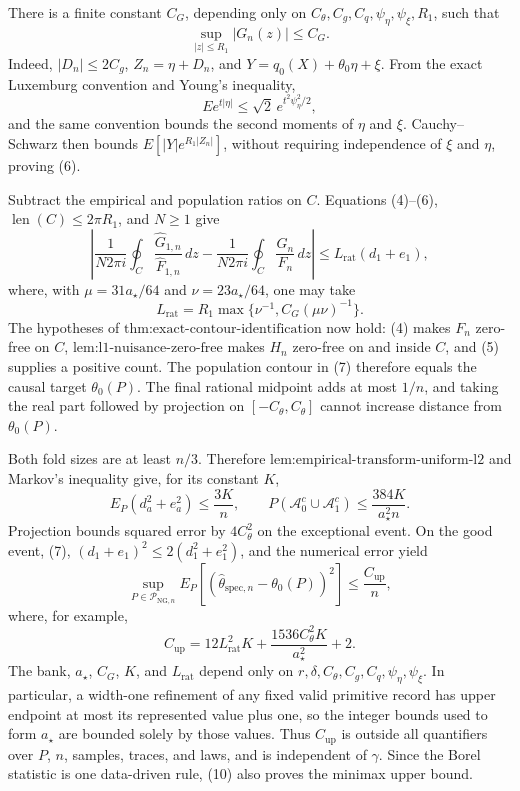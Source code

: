 There is a finite constant \(C_G\), depending only on
\(C_{\theta},C_g,C_q,\psi_{\eta},\psi_{\xi},R_1\), such that
\[
 \sup_{|z|\le R_1}|G_n(z)|\le C_G.                               \tag{6}
\]
Indeed, \(|D_n|\le2C_g\), \(Z_n=\eta+D_n\), and
\(Y=q_0(X)+\theta_0\eta+\xi\).  From the exact Luxemburg convention and
Young's inequality,
\[
 E e^{t|\eta|}\le\sqrt2\,e^{t^2\psi_{\eta}^2/2},
\]
and the same convention bounds the second moments of \(\eta\) and \(\xi\).
Cauchy--Schwarz then bounds
\(E[|Y|e^{R_1|Z_n|}]\), without requiring independence of \(\xi\) and
\(\eta\), proving (6).

Subtract the empirical and population ratios on \(C\).  Equations
(4)--(6), \(\operatorname{len}(C)\le2\pi R_1\), and \(N\ge1\) give
\[
 \left|
 \frac1{N2\pi i}\oint_C\frac{\widehat G_{1,n}}{\widehat F_{1,n}}\,dz
 -\frac1{N2\pi i}\oint_C\frac{G_n}{F_n}\,dz
 \right|
 \le L_{\mathrm{rat}}(d_1+e_1),                                  \tag{7}
\]
where, with \(\mu=31a_{\star}/64\) and
\(\nu=23a_{\star}/64\), one may take
\[
 L_{\mathrm{rat}}
 =R_1\max\{\nu^{-1},C_G(\mu\nu)^{-1}\}.                         \tag{8}
\]
The hypotheses of \(\text{thm:exact-contour-identification}\) now hold:
(4) makes \(F_n\) zero-free on \(C\),
\(\text{lem:l1-nuisance-zero-free}\) makes \(H_n\) zero-free on and inside
\(C\), and (5) supplies a positive count.  The population contour in (7)
therefore equals the causal target \(\theta_0(P)\).  The final rational
midpoint adds at most \(1/n\), and taking the real part followed by
projection on \([-C_{\theta},C_{\theta}]\) cannot increase distance from
\(\theta_0(P)\).

Both fold sizes are at least \(n/3\).  Therefore
\(\text{lem:empirical-transform-uniform-l2}\) and Markov's inequality give,
for its constant \(K\),
\[
 E_P(d_a^2+e_a^2)\le\frac{3K}{n},
 \qquad
 P(\mathcal A_0^c\cup\mathcal A_1^c)
 \le\frac{384K}{a_{\star}^2n}.                                  \tag{9}
\]
Projection bounds squared error by \(4C_{\theta}^2\) on the exceptional
event.  On the good event, (7),
\((d_1+e_1)^2\le2(d_1^2+e_1^2)\), and the numerical error yield
\[
 \sup_{P\in\mathcal P_{\mathrm{NG},n}}
 E_P[(\widehat\theta_{\mathrm{spec},n}-\theta_0(P))^2]
 \le\frac{C_{\mathrm{up}}}{n},                                  \tag{10}
\]
where, for example,
\[
 C_{\mathrm{up}}
 =12L_{\mathrm{rat}}^2K
 +\frac{1536C_{\theta}^2K}{a_{\star}^2}+2.                      \tag{11}
\]
The bank, \(a_{\star}\), \(C_G\), \(K\), and
\(L_{\mathrm{rat}}\) depend only on
\(r,\delta,C_{\theta},C_g,C_q,\psi_{\eta},\psi_{\xi}\).  In particular,
a width-one refinement of any fixed valid primitive record has upper endpoint
at most its represented value plus one, so the integer bounds used to form
\(a_{\star}\) are bounded solely by those values.  Thus
\(C_{\mathrm{up}}\) is outside all quantifiers over \(P\), \(n\), samples,
traces, and laws, and is independent of \(\gamma\).  Since the Borel
statistic is one data-driven rule, (10) also proves the minimax upper bound.

